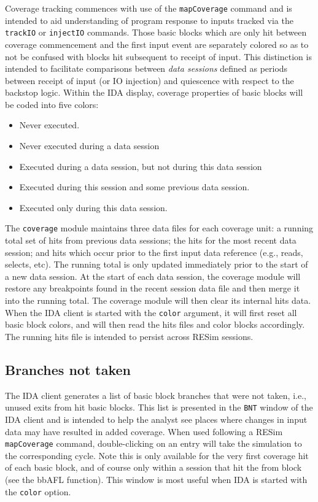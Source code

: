 \documentclass[titlepage]{article}
\begin{document}
\begin{appendices}
Coverage tracking commences with use of the {\tt mapCoverage} command and is intended to aid understanding of program response to inputs tracked via 
the {\tt trackIO} or {\tt injectIO} commands.  Those basic blocks which are only hit between coverage commencement and the first input event are separately colored so as to not
be confused with blocks hit subsequent to receipt of input.  This distinction is intended to facilitate comparisons between \textit{data sessions} defined as periods
between receipt of input (or IO injection) and quiescence with respect to the backstop logic.
Within the IDA display, coverage properties of basic blocks will be
coded into five colors:
\begin{itemize}
\item Never executed.
\item Never executed during a data session
\item Executed during a data session, but not during this data session
\item Executed during this session and some previous data session.
\item Executed only during this data session.
\end{itemize}

The {\tt coverage} module maintains three data files for each coverage unit: a running total set of hits from previous data sessions; the hits for the most recent data session;
and hits which occur prior to the first input data reference (e.g., reads, selects, etc).  The running total is only updated immediately prior to the start 
of a new data session.  At the start of each data session, the coverage module will restore any breakpoints found
in the recent session data file and then merge it into the running total.  The coverage module will then clear its internal hits data.  
When the IDA client is started with the {\tt color} argument, it will first
reset all basic block colors,  and will then read the hits files and color blocks accordingly.  The running hits file is intended to persist across
RESim sessions.  

\subsection{Branches not taken}
\label{BNT}
The IDA client generates a list of basic block branches that were not taken, i.e., unused exits from hit basic blocks.  This list is presented in the {\tt BNT} window of the IDA client
and is intended to help the analyst see places where changes in input data may have resulted in added coverage.  When used following a
RESim {\tt mapCoverage} command, double-clicking on an entry will take the simulation to the corresponding 
cycle.  Note this is only available for the very first coverage hit of each basic block, and of course only within a session that hit the from block (see the bbAFL function).  This window is most useful when IDA is started with the {\tt color} option.


\end{appendices}
\end{document}
